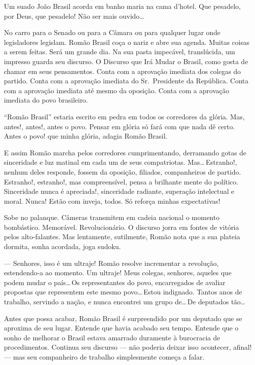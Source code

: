 Um suado João Brasil acorda em banho maria na cama d'hotel. Que pesadelo, por Deus, que pesadelo! Não ser mais ouvido\ldots



No carro para o Senado ou para a Câmara ou para qualquer lugar onde legisladores legislam. Romão Brasil coça o nariz e abre sua agenda. Muitas coisas a serem feitas. Será um grande dia. Na sua pasta impecável, translúcida, um impresso guarda seu discurso. O Discurso que Irá Mudar o Brasil, como gosta de chamar em seus pensamentos. Conta com a aprovação imediata dos colegas do partido. Conta com a aprovação imediata do Sr.~Presidente da República. Conta com a aprovação imediata até mesmo da oposição. Conta com a aprovação imediata do povo brasileiro.

``Romão Brasil'' estaria escrito em pedra em todos os corredores da glória. Mas, antes!, antes!, antes o povo. Pensar em glória só fará com que nada dê certo. Antes o povo! que minha glória, adagia Romão Brasil.

E assim Romão marcha pelos corredores cumprimentando, derramando gotas de sinceridade e luz matinal em cada um de seus compatriotas. Mas\ldots\,Estranho!, nenhum deles responde, fossem da oposição, filiados, companheiros de partido. Estranho!, estranho!, mas compreensível, pensa a brilhante mente do político. Sinceridade nunca é apreciada!, sinceridade radiante, superação intelectual e moral. Nunca! Estão com inveja, todos. Só reforça minhas expectativas!

Sobe no palanque. Câmeras transmitem em cadeia nacional o momento bombástico. Memorável. Revolucionário. O discurso jorra em fontes de vitória pelos alto-falantes. Mas lentamente, sutilmente, Romão nota que a sua plateia dormita, sonha acordada, joga sudoku.

--- Senhores, isso é um ultraje! Romão resolve incrementar a revolução, estendendo-a ao momento. Um ultraje! Meus colegas, senhores, aqueles que podem mudar o país\ldots\,Os representantes do povo, encarregados de avaliar propostas que representem este mesmo povo\ldots\,Estou indignado. Tantos anos de trabalho, servindo a nação, e nunca encontrei um grupo de\ldots\,De deputados tão\ldots

Antes que possa acabar, Romão Brasil é surpreendido por um deputado que se aproxima de seu lugar. Entende que havia acabado seu tempo. Entende que o sonho de melhorar o Brasil estava amarrado duramente à burocracia de procedimentos. Continua seu discurso --- não poderia deixar isso acontecer, afinal! --- mas seu companheiro de trabalho simplesmente começa a falar.

